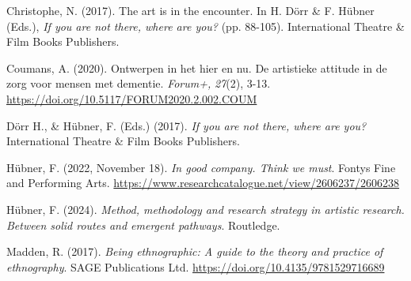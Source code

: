 \documentclass[authordate, empirical]{jote-new-article}
\begin{document}
	Christophe, N. (2017). The art is in the encounter. In H. Dörr \& F. Hübner (Eds.), \emph{If you are not there, where are you?} (pp. 88-105). International Theatre \& Film Books Publishers.







	Coumans, A. (2020). Ontwerpen in het hier en nu. De artistieke attitude in de zorg voor mensen met dementie. \emph{Forum+,} \emph{27}(2), 3-13. \url{https://doi.org/10.5117/FORUM2020.2.002.COUM}







	Dörr H., \& Hübner, F. (Eds.) (2017). \emph{If you are not there, where are you?} International Theatre \& Film Books Publishers.







	Hübner, F. (2022, November 18). \emph{In good company. Think we must}. Fontys Fine and Performing Arts. \url{https://www.researchcatalogue.net/view/2606237/2606238}







	Hübner, F. (2024). \emph{Method, methodology and research strategy in artistic research. Between solid routes and emergent pathways}. Routledge.







	Madden, R. (2017). \emph{Being ethnographic: A guide to the theory and practice of ethnography}. SAGE Publications Ltd. \url{https://doi.org/10.4135/9781529716689}
\end{document}

